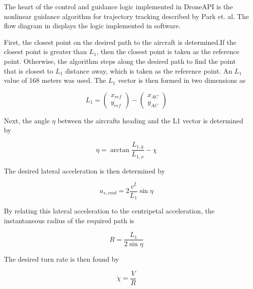 \documentclass{aiaa}
\begin{document}
The heart of the control and guidance logic implemented in DroneAPI is the nonlinear guidance algorithm for trajectory tracking described by Park et. al. The flow diagram in  displays the logic implemented in software. 


First, the closest point on the desired path to the aircraft is determined.If the closest point is greater than $L_1$, then the closest point is taken as the reference point. Otherwise, the algorithm steps along the desired path to find the point that is closest to $L_1$ distance away, which is taken as the reference point. An $L_1$ value of 168 meters was used. The $L_1$ vector is then formed in two dimensions as

\begin{equation}
	L_1 = 
    \begin{pmatrix}
    	x_{ref}\\
        y_{ref}
    \end{pmatrix}
    -
    \begin{pmatrix}
    	x_{AC}\\
        y_{AC}
    \end{pmatrix}
\end{equation}

Next, the angle $\eta$ between the aircrafts heading and the L1 vector is determined by

\begin{equation}
	\eta = \arctan{\frac{L_{1,y}}{L_{1,x}}} - \chi
\end{equation}

The desired lateral acceleration is then determined by

\begin{equation}
	a_{s,cmd} = 2\frac{v^2}{L_1}\sin{\eta}
    \end{equation}
    
    By relating this lateral acceleration to the centripetal acceleration, the instantaneous radius of the required path is
    
    \begin{equation}
    R = \frac{L_1}{2\sin{\eta}}
    \end{equation}
    
    The desired turn rate is then found by
    
    \begin{equation}
    \dot{\chi} = \frac{V}{R}
    \end{equation}
\end{document}
